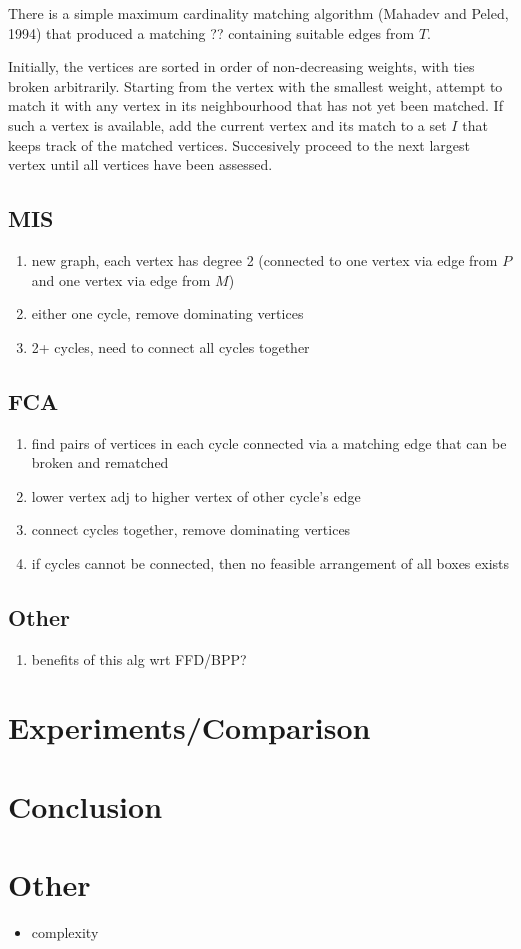 \documentclass{llncs}
\begin{document}
There is a simple maximum cardinality matching algorithm (Mahadev and Peled, 1994) that produced a matching ?? containing suitable edges from $T$.

Initially, the vertices are sorted in order of non-decreasing weights, with ties broken arbitrarily. Starting from the vertex with the smallest weight, attempt to match it with any vertex in its neighbourhood that has not yet been matched. If such a vertex is available, add the current vertex and its match to a set $I$ that keeps track of the matched vertices. Succesively proceed to the next largest vertex until all vertices have been assessed.



\subsection{MIS}
\begin{enumerate}
	\item new graph, each vertex has degree 2 (connected to one vertex via edge from $P$ and one vertex via edge from $M$)
	\item either one cycle, remove dominating vertices
	\item 2+ cycles, need to connect all cycles together
\end{enumerate}


\subsection{FCA}
\begin{enumerate}
	\item find pairs of vertices in each cycle connected via a matching edge that can be broken and rematched
	\item lower vertex adj to higher vertex of other cycle's edge
	\item connect cycles together, remove dominating vertices
	\item if cycles cannot be connected, then no feasible arrangement of all boxes exists
\end{enumerate}

\subsection{Other}
\begin{enumerate}
	\item benefits of this alg wrt FFD/BPP?
\end{enumerate}


\section{Experiments/Comparison}

\section{Conclusion}

\section{Other}
\begin{itemize}
	\item complexity
\end{itemize}
\end{document}
